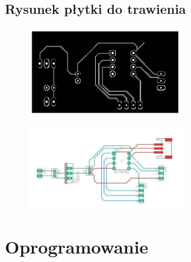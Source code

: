 \documentclass{article}
\begin{document}



\subsection{Rysunek płytki do trawienia}
\begin{figure}[ht!]
    \centering
    \includegraphics[width=0.6\textwidth]{plytka1.jpg}
    \label{fig:plytka1}
\end{figure}

\begin{figure}[ht!]
    \centering
    \includegraphics[width=0.6\textwidth]{plytka2.jpg}
    \label{fig:plytka2}
\end{figure}


\section{Oprogramowanie}
\end{document}
